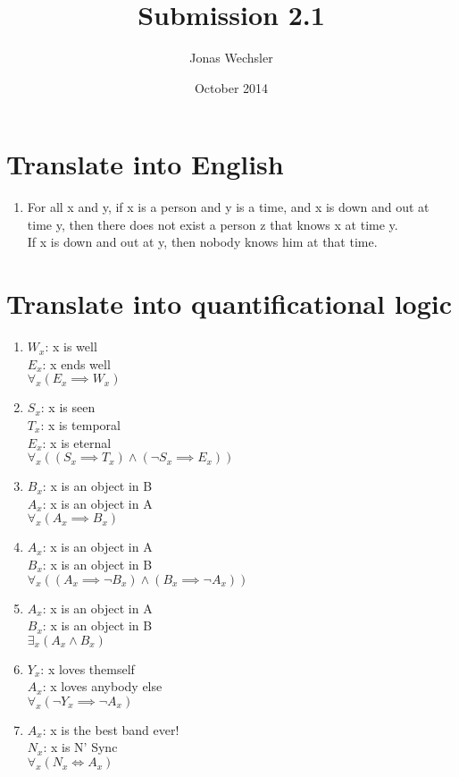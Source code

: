 \documentclass{article}
\title{Submission 2.1}
\author{Jonas Wechsler}
\date{October 2014}
\begin{document}
	\maketitle
	\section{Translate into English}
	\begin{enumerate}
		\item
			For all x and y, if x is a person and y is a time, and x is down and out at time y, then there does not exist a person z that knows x at time y.\\
			If x is down and out at y, then nobody knows him at that time.
	\end{enumerate}
	\section{Translate into quantificational logic}
	\begin{enumerate}
		\item
			$W_x$: x is well\\
			$E_x$: x ends well\\
			$\forall _x(E_x \implies W_x)$\\
		\item
			$S_x$: x is seen\\
			$T_x$: x is temporal\\
			$E_x$: x is eternal\\
			$\forall _x((S_x \implies T_x)\land(\lnot S_x \implies E_x))$\\
		\item
			$B_x$: x is an object in B\\
			$A_x$: x is an object in A\\
			$\forall _x(A_x \implies B_x)$\\
		\item
			$A_x$: x is an object in A\\
			$B_x$: x is an object in B\\
			$\forall _x((A_x \implies \lnot B_x)\land(B_x \implies \lnot A_x))$\\
		\item
			$A_x$: x is an object in A\\
			$B_x$: x is an object in B\\
			$\exists _x(A_x \land B_x)$\\
		\item
			$Y_x$: x loves themself\\
			$A_x$: x loves anybody else\\
			$\forall _x(\lnot Y_x \implies \lnot A_x)$\\
		\item
			$A_x$: x is the best band ever!\\
			$N_x$: x is N' Sync\\
			$\forall _x(N_x \iff A_x)$\\

	\end{enumerate}
\end{document}

